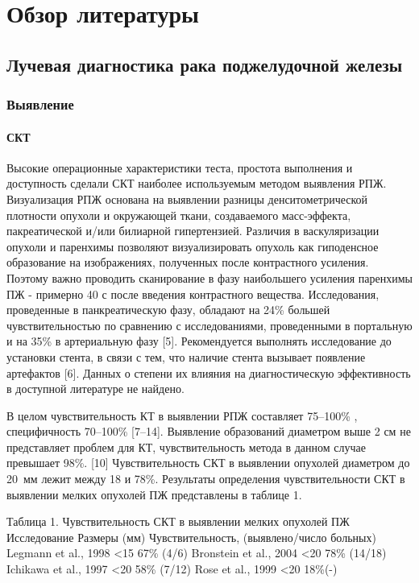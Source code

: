 \chapter{Обзор литературы} \label{rewiev}
\section{Лучевая диагностика рака поджелудочной железы} \label{pancreas_radiology}
\subsection{Выявление}
\subsubsection{СКТ}
Высокие операционные характеристики теста, простота выполнения и доступность сделали СКТ наиболее используемым методом выявления РПЖ. 
Визуализация РПЖ основана на выявлении разницы денситометрической плотности опухоли и окружающей ткани, создаваемого масс-эффекта, пакреатической и/или билиарной гипертензией. 
Различия в васкуляризации опухоли и паренхимы позволяют визуализировать опухоль как гиподенсное образование на изображениях, полученных после контрастного усиления. Поэтому важно проводить сканирование в фазу наибольшего усиления паренхимы ПЖ - примерно 40 с после введения контрастного вещества. Исследования, проведенные в панкреатическую фазу, обладают на 24\% большей чувствительностью по сравнению с исследованиями, проведенными в портальную и на 35\% в артериальную фазу [5]. Рекомендуется выполнять исследование до установки стента, в связи с тем, что наличие стента вызывает появление артефактов [6]. Данных о степени их влияния на диагностическую эффективность в доступной литературе не найдено.

В целом чувствительность КТ в выявлении РПЖ составляет 75–100\% , специфичность 70–100\% [7–14]. Выявление образований диаметром выше 2 см не представляет проблем для КТ, чувствительность метода в данном случае превышает 98\%. [10]
Чувствительность СКТ в выявлении опухолей диаметром  до 20~мм лежит между 18 и 78\%. Результаты определения чувствительности СКТ в выявлении мелких опухолей ПЖ представлены в таблице 1.

Таблица 1. Чувствительность СКТ в выявлении мелких опухолей ПЖ
Исследование	Размеры (мм)	Чувствительность, (выявлено/число больных)
Legmann et al., 1998	<15	67\% (4/6)
Bronstein et al., 2004	<20	78\% (14/18)
Ichikawa et al., 1997	<20	58\% (7/12)
Rose et al., 1999	<20	18\%(-)

